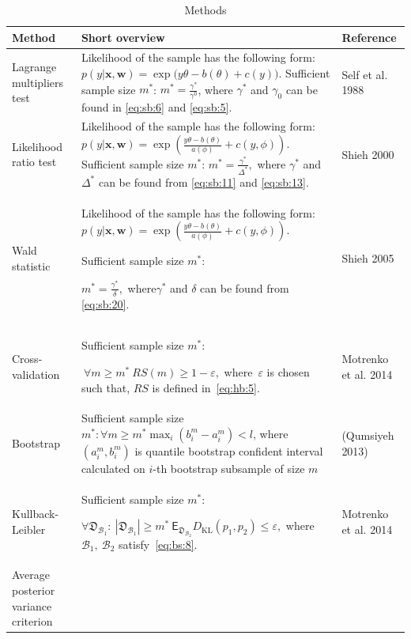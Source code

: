 \documentclass[
11pt,%
tightenlines,%
twoside,%
onecolumn,%
nofloats,%
nobibnotes,%
nofootinbib,%
superscriptaddress,%
noshowpacs,%
centertags]%
{revtex4}
\begin{document}
\begin{table}
\begin{center}
\caption{Methods}
\label{table1}
\begin{tabular}{|p{}|p{}|p{}|}
\hline
	\centering Method &\centering Short overview & Reference\\
\hline
	Lagrange multipliers test &
	Likelihood of the sample has the following form:
   	$p(y|\textbf{x}, \textbf{w}) = \exp\bigl(y\theta- b(\theta) + c\left(y\right)\bigr).$
	Sufficient sample size $m^*$:
	$m^* = \frac{\gamma^*}{\gamma^0}$, where $\gamma^*$ and $\gamma_0$ can be found in \eqref{eq:sb:6} and \eqref{eq:sb:5}.
	&Self et al. 1988\\
\hline
	Likelihood ratio test&
	Likelihood of the sample has the following form:
	$p(y|\textbf{x}, \textbf{w}) = \exp\left(\frac{y\theta- b(\theta)}{a(\phi)} + c\left(y, \phi\right)\right).$
	Sufficient sample size $m^*$: 
	$m^* = \frac{\gamma^*}{\Delta^*},$ where $\gamma^*$ and $\Delta^*$ can be found from \eqref{eq:sb:11} and \eqref{eq:sb:13}.
	&Shieh 2000\\
\hline
	Wald statistic&
	Likelihood of the sample has the following form:
	$p(y|\textbf{x}, \textbf{w}) = \exp\left(\frac{y\theta- b(\theta)}{a(\phi)} + c\left(y, \phi\right)\right).$
	
	Sufficient sample size $m^*$: 
	
	$m^* = \frac{\gamma^*}{\delta},$ where$\gamma^*$ and $\delta$ can be found from \eqref{eq:sb:20}.
	&Shieh 2005\\
\hline
	Cross-validation&
	
	Sufficient sample size $m^*$: 
	
	$~\forall m \geq m^*~RS(m) \geq 1- \varepsilon,$
	where~$\varepsilon$ is chosen such that, $RS$ is defined in~\eqref{eq:hb:5}.
	&Motrenko et al. 2014\\
\hline
	Bootstrap&
	
	Sufficient sample size  $m^*: \forall m\geq m^* \max_i\left(b^m_i - a^m_i\right) < l$, where $(a^m_i,  b^m_i)$ is quantile bootstrap confident interval calculated on $i$-th bootstrap subsample of size $m$

	&(Qumsiyeh 2013)\\
\hline
	Kullback-Leibler&
	
	Sufficient sample size $m^*$: 
	
	$\forall \mathfrak{D}_{\mathcal{B}_1}:~\left|\mathfrak{D}_{\mathcal{B}_1}\right| \geq m^*  ~ \mathsf{E}_{\mathfrak{D}_{\mathcal{B}_2}}D_\text{KL}\left(p_1, p_2\right) \leq \varepsilon,$
	where $\mathcal{B}_1,~\mathcal{B}_2$ satisfy~\eqref{eq:bs:8}.
	&Motrenko et al. 2014\\
\hline
	Average posterior variance criterion&
	

\end{tabular}
\end{center}
\end{table}
\end{document}
